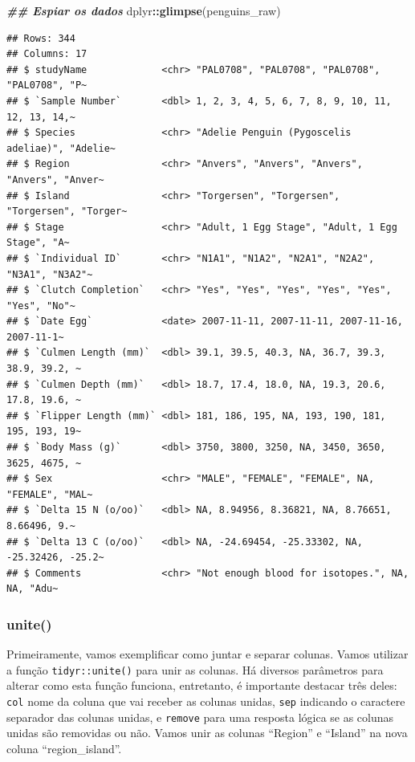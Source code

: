 \documentclass[
]{article}
\newenvironment{Shaded}{\begin{snugshade}}{\end{snugshade}}
\newcommand{\DocumentationTok}[1]{\textcolor[rgb]{0.56,0.35,0.01}{\textbf{\textit{#1}}}}
\newcommand{\FunctionTok}[1]{\textcolor[rgb]{0.13,0.29,0.53}{\textbf{#1}}}
\newcommand{\NormalTok}[1]{#1}
\newcommand{\SpecialCharTok}[1]{\textcolor[rgb]{0.81,0.36,0.00}{\textbf{#1}}}
\begin{document}
\begin{Shaded}
\begin{Highlighting}[]
\DocumentationTok{\#\# Espiar os dados}
\NormalTok{dplyr}\SpecialCharTok{::}\FunctionTok{glimpse}\NormalTok{(penguins\_raw)}
\end{Highlighting}
\end{Shaded}

\begin{verbatim}
## Rows: 344
## Columns: 17
## $ studyName             <chr> "PAL0708", "PAL0708", "PAL0708", "PAL0708", "P~
## $ `Sample Number`       <dbl> 1, 2, 3, 4, 5, 6, 7, 8, 9, 10, 11, 12, 13, 14,~
## $ Species               <chr> "Adelie Penguin (Pygoscelis adeliae)", "Adelie~
## $ Region                <chr> "Anvers", "Anvers", "Anvers", "Anvers", "Anver~
## $ Island                <chr> "Torgersen", "Torgersen", "Torgersen", "Torger~
## $ Stage                 <chr> "Adult, 1 Egg Stage", "Adult, 1 Egg Stage", "A~
## $ `Individual ID`       <chr> "N1A1", "N1A2", "N2A1", "N2A2", "N3A1", "N3A2"~
## $ `Clutch Completion`   <chr> "Yes", "Yes", "Yes", "Yes", "Yes", "Yes", "No"~
## $ `Date Egg`            <date> 2007-11-11, 2007-11-11, 2007-11-16, 2007-11-1~
## $ `Culmen Length (mm)`  <dbl> 39.1, 39.5, 40.3, NA, 36.7, 39.3, 38.9, 39.2, ~
## $ `Culmen Depth (mm)`   <dbl> 18.7, 17.4, 18.0, NA, 19.3, 20.6, 17.8, 19.6, ~
## $ `Flipper Length (mm)` <dbl> 181, 186, 195, NA, 193, 190, 181, 195, 193, 19~
## $ `Body Mass (g)`       <dbl> 3750, 3800, 3250, NA, 3450, 3650, 3625, 4675, ~
## $ Sex                   <chr> "MALE", "FEMALE", "FEMALE", NA, "FEMALE", "MAL~
## $ `Delta 15 N (o/oo)`   <dbl> NA, 8.94956, 8.36821, NA, 8.76651, 8.66496, 9.~
## $ `Delta 13 C (o/oo)`   <dbl> NA, -24.69454, -25.33302, NA, -25.32426, -25.2~
## $ Comments              <chr> "Not enough blood for isotopes.", NA, NA, "Adu~
\end{verbatim}

\hypertarget{unite}{%
\subsubsection{unite()}\label{unite}}

Primeiramente, vamos exemplificar como juntar e separar colunas. Vamos utilizar a função \texttt{tidyr::unite()} para unir as colunas. Há diversos parâmetros para alterar como esta função funciona, entretanto, é importante destacar três deles: \texttt{col} nome da coluna que vai receber as colunas unidas, \texttt{sep} indicando o caractere separador das colunas unidas, e \texttt{remove} para uma resposta lógica se as colunas unidas são removidas ou não. Vamos unir as colunas ``Region'' e ``Island'' na nova coluna ``region\_island''.
\end{document}

